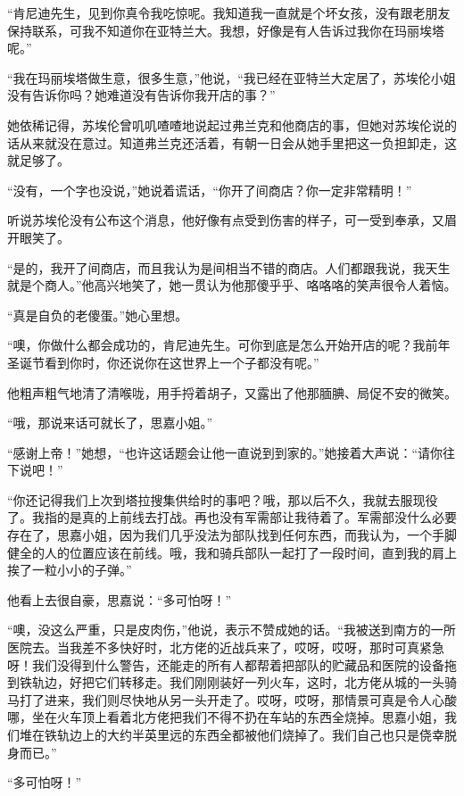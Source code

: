 \par “肯尼迪先生，见到你真令我吃惊呢。我知道我一直就是个坏女孩，没有跟老朋友保持联系，可我不知道你在亚特兰大。我想，好像是有人告诉过我你在玛丽埃塔呢。”
\par “我在玛丽埃塔做生意，很多生意，”他说，“我已经在亚特兰大定居了，苏埃伦小姐没有告诉你吗？她难道没有告诉你我开店的事？”
\par 她依稀记得，苏埃伦曾叽叽喳喳地说起过弗兰克和他商店的事，但她对苏埃伦说的话从来就没在意过。知道弗兰克还活着，有朝一日会从她手里把这一负担卸走，这就足够了。
\par “没有，一个字也没说，”她说着谎话，“你开了间商店？你一定非常精明！”
\par 听说苏埃伦没有公布这个消息，他好像有点受到伤害的样子，可一受到奉承，又眉开眼笑了。
\par “是的，我开了间商店，而且我认为是间相当不错的商店。人们都跟我说，我天生就是个商人。”他高兴地笑了，她一贯认为他那傻乎乎、咯咯咯的笑声很令人着恼。
\par “真是自负的老傻蛋。”她心里想。
\par “噢，你做什么都会成功的，肯尼迪先生。可你到底是怎么开始开店的呢？我前年圣诞节看到你时，你还说你在这世界上一个子都没有呢。”
\par 他粗声粗气地清了清喉咙，用手捋着胡子，又露出了他那腼腆、局促不安的微笑。
\par “哦，那说来话可就长了，思嘉小姐。”
\par “感谢上帝！”她想，“也许这话题会让他一直说到到家的。”她接着大声说：“请你往下说吧！”
\par “你还记得我们上次到塔拉搜集供给时的事吧？哦，那以后不久，我就去服现役了。我指的是真的上前线去打战。再也没有军需部让我待着了。军需部没什么必要存在了，思嘉小姐，因为我们几乎没法为部队找到任何东西，而我认为，一个手脚健全的人的位置应该在前线。哦，我和骑兵部队一起打了一段时间，直到我的肩上挨了一粒小小的子弹。”
\par 他看上去很自豪，思嘉说：“多可怕呀！”
\par “噢，没这么严重，只是皮肉伤，”他说，表示不赞成她的话。“我被送到南方的一所医院去。当我差不多快好时，北方佬的近战兵来了，哎呀，哎呀，那时可真紧急呀！我们没得到什么警告，还能走的所有人都帮着把部队的贮藏品和医院的设备拖到铁轨边，好把它们转移走。我们刚刚装好一列火车，这时，北方佬从城的一头骑马打了进来，我们则尽快地从另一头开走了。哎呀，哎呀，那情景可真是令人心酸哪，坐在火车顶上看着北方佬把我们不得不扔在车站的东西全烧掉。思嘉小姐，我们堆在铁轨边上的大约半英里远的东西全都被他们烧掉了。我们自己也只是侥幸脱身而已。”
\par “多可怕呀！”
